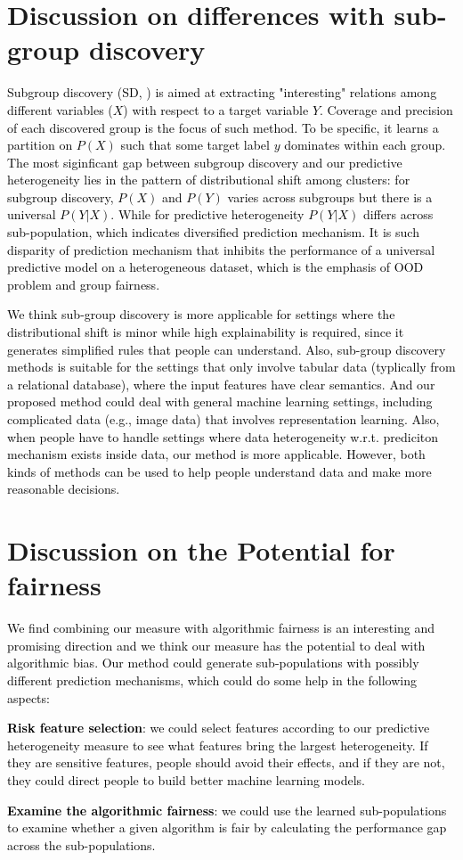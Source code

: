 \section{Discussion on differences with sub-group discovery}
\textcolor{black}{Subgroup discovery (SD, \citep{helal2016subgroup}) is aimed at extracting "interesting" relations among different variables ($X$) with respect to a target variable $Y$. Coverage and precision of each discovered group is the focus of such method. To be specific, it learns a partition on $P(X)$ such that some target label $y$ dominates within each group. The most siginficant gap between subgroup discovery and our predictive heterogeneity lies in the pattern of distributional shift among clusters: for subgroup discovery, $P(X)$ and $P(Y)$ varies across subgroups but there is a universal $P(Y|X)$. While for predictive heterogeneity $P(Y|X)$ differs across sub-population, which indicates diversified prediction mechanism. It is such disparity of prediction mechanism that inhibits   the performance of a universal predictive model on a heterogeneous dataset, which is the emphasis of OOD problem and group fairness.} 

\textcolor{black}{We think sub-group discovery is more applicable for settings where the distributional shift is minor while high explainability is required, since it generates simplified rules that people can understand. Also, sub-group discovery methods is suitable for the settings that only involve tabular data (typlically from a relational database), where the input features have clear semantics. 
And our proposed method could deal with general machine learning settings, including complicated data (e.g., image data) that involves representation learning.
Also, when people have to handle settings where data heterogeneity w.r.t. prediciton mechanism exists inside data, our method is more applicable.
However, both kinds of methods can be used to help people understand data and make more reasonable decisions.}

\section{Discussion on the Potential for fairness}
\textcolor{black}{We find combining our measure with algorithmic fairness is an interesting and promising direction and we think our measure has the potential to deal with algorithmic bias. 
Our method could generate sub-populations with possibly different prediction mechanisms, which could do some help in the following aspects:}

\textcolor{black}{\textbf{Risk feature selection}: we could select features according to our predictive heterogeneity measure to see what features bring the largest heterogeneity. If they are sensitive features, people should avoid their effects, and if they are not, they could direct people to build better machine learning models.}

\textcolor{black}{\textbf{Examine the algorithmic fairness}: we could use the learned sub-populations to examine whether a given algorithm is fair by calculating the performance gap across the sub-populations.}